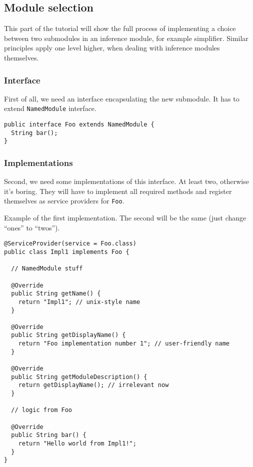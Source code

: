 \documentclass[a4paper,10pt,oneside]{article}
\begin{document}
\subsection*{Module selection}

\par 
  This part of the tutorial will show the full process of implementing a choice
  between two submodules in an inference module, for example simplifier. Similar
  principles apply one level higher, when dealing with inference modules themselves.


\subsubsection*{Interface}

\par 
  First of all, we need an interface encapsulating the new submodule. It has to
  extend \texttt{NamedModule} interface.


\begin{verbatim}
public interface Foo extends NamedModule {
  String bar();
}
\end{verbatim}

\subsubsection*{Implementations}

\par 
  Second, we need some implementations of this interface. At least two, otherwise
  it's boring.
  They will have to implement all required methods and register themselves as
  service providers for \texttt{Foo}.


\noindent Example of the first implementation. The second will be the same (just change ``ones'' to ``twos'').
\begin{verbatim}
@ServiceProvider(service = Foo.class)
public class Impl1 implements Foo {

  // NamedModule stuff

  @Override
  public String getName() {
    return "Impl1"; // unix-style name
  }

  @Override
  public String getDisplayName() {
    return "Foo implementation number 1"; // user-friendly name
  }

  @Override
  public String getModuleDescription() {
    return getDisplayName(); // irrelevant now
  }

  // logic from Foo

  @Override
  public String bar() {
    return "Hello world from Impl1!";
  }
}
\end{verbatim}
\end{document}
